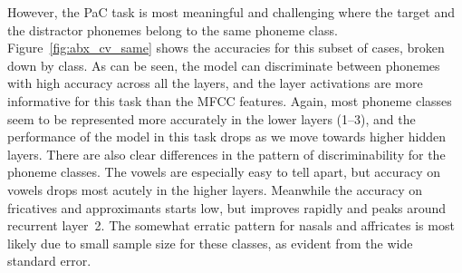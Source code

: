 However, the PaC task is most meaningful and challenging where the target and the distractor 
phonemes belong to the same phoneme class. Figure~\ref{fig:abx_cv_same} shows the 
accuracies for this subset of cases, broken down by class.
%
As can be seen, the model can discriminate between phonemes with high accuracy across all 
the layers, and the layer activations are more informative for this task than the MFCC features. 
Again, most phoneme classes seem to be represented more accurately in the lower layers (1--3), and the performance of the model in this task drops as we move towards higher hidden layers. There are also clear differences in the pattern of discriminability for the phoneme classes. The vowels are especially easy to tell apart, but accuracy on vowels drops most acutely in the higher layers. Meanwhile the accuracy on fricatives and approximants starts low, but improves rapidly and peaks around recurrent layer~2. 
The somewhat erratic pattern for nasals and affricates is most likely due to small sample size for these classes, as evident from the wide standard error. 
